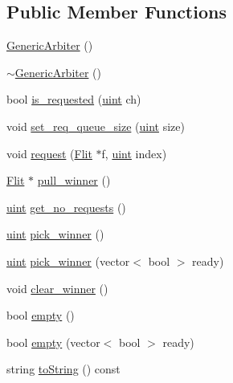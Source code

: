 \subsection*{Public Member Functions}
\begin{CompactItemize}
\item 
\hyperlink{classGenericArbiter_f268b17257b6084b8faa82e4539580f5}{GenericArbiter} ()
\item 
\hyperlink{classGenericArbiter_c8e72db9c3fb2c9b406933a104592519}{$\sim$GenericArbiter} ()
\item 
bool \hyperlink{classGenericArbiter_6cb1ab1819bd58fc51935af5af5bd6d5}{is\_\-requested} (\hyperlink{outputBuffer_8h_91ad9478d81a7aaf2593e8d9c3d06a14}{uint} ch)
\item 
void \hyperlink{classGenericArbiter_adbe3775870bfc27a5f57e37d73cec5b}{set\_\-req\_\-queue\_\-size} (\hyperlink{outputBuffer_8h_91ad9478d81a7aaf2593e8d9c3d06a14}{uint} size)
\item 
void \hyperlink{classGenericArbiter_2ecaad77822910dd7353c8c03f116690}{request} (\hyperlink{classFlit}{Flit} $\ast$f, \hyperlink{outputBuffer_8h_91ad9478d81a7aaf2593e8d9c3d06a14}{uint} index)
\item 
\hyperlink{classFlit}{Flit} $\ast$ \hyperlink{classGenericArbiter_16e40d95e115c183d604611c6e4c875c}{pull\_\-winner} ()
\item 
\hyperlink{outputBuffer_8h_91ad9478d81a7aaf2593e8d9c3d06a14}{uint} \hyperlink{classGenericArbiter_6f8e4f27cf748d7e73f3065d3d8beb2b}{get\_\-no\_\-requests} ()
\item 
\hyperlink{outputBuffer_8h_91ad9478d81a7aaf2593e8d9c3d06a14}{uint} \hyperlink{classGenericArbiter_4a5b38f3d16471a75c0c35fc1ecb3031}{pick\_\-winner} ()
\item 
\hyperlink{outputBuffer_8h_91ad9478d81a7aaf2593e8d9c3d06a14}{uint} \hyperlink{classGenericArbiter_d150c66feabc2154efea2fbad441cfc1}{pick\_\-winner} (vector$<$ bool $>$ ready)
\item 
void \hyperlink{classGenericArbiter_137758be6498b8dc717cf4d4c8bc56be}{clear\_\-winner} ()
\item 
bool \hyperlink{classGenericArbiter_bd1e990e713578e87719e634884effa6}{empty} ()
\item 
bool \hyperlink{classGenericArbiter_0e9396065d7b437fbac43768b3dfb7c1}{empty} (vector$<$ bool $>$ ready)
\item 
string \hyperlink{classGenericArbiter_dfd7645d22ce13eb428e73fd9fa34b63}{toString} () const 
\end{CompactItemize}
